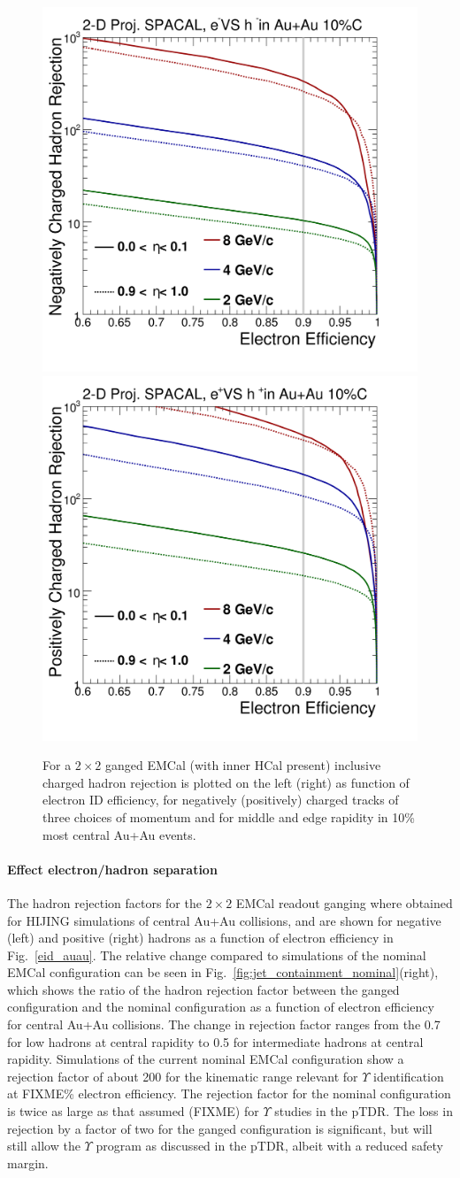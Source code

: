 \begin{figure}[hbt]
  \centering
  \includegraphics[width=0.4\linewidth]{figs/DrawEcal_Likelihood_Sum_RejectionCurve_AuAuSummary}
  \hspace{0.1\linewidth}
  \includegraphics[width=0.4\linewidth]{figs/DrawEcal_Likelihood_Sum_RejectionCurve_AuAuSummaryPos}
  \caption{For a $2\times2$ ganged EMCal (with inner HCal present)
    inclusive charged hadron rejection is plotted on the left (right)
    as function of electron ID efficiency, for negatively (positively)
    charged tracks of three choices of momentum and for middle and
    edge rapidity in 10\% most central Au+Au events.}
  \label{fig:eid_auau}
\end{figure}

\paragraph{Effect electron/hadron separation}

The hadron rejection factors  for the $2\times 2$ EMCal readout ganging where obtained for HIJING simulations of central Au+Au collisions, and are
shown for negative (left) and positive (right) hadrons as a function of electron efficiency in Fig.~\ref{eid_auau}. 
The relative change compared to simulations of the nominal EMCal configuration can be seen in Fig.~\ref{fig:jet_containment_nominal}(right), which shows
the ratio of the hadron rejection factor between the ganged configuration and the nominal configuration as a function
of electron efficiency for central Au+Au collisions. The change in rejection factor ranges from the 0.7 for low \pt hadrons
at central rapidity to 0.5 for intermediate \pt hadrons at central rapidity. Simulations of the current nominal EMCal 
configuration show a rejection factor of about 200 for the kinematic range relevant for $\Upsilon$ identification at FIXME\%
electron efficiency. The rejection factor for the nominal configuration is twice as large as that assumed (FIXME) 
for $\Upsilon$ studies in the pTDR. The loss in rejection by a factor of two for the ganged configuration is significant, but
will still allow the $\Upsilon$ program as discussed in the pTDR, albeit with a reduced safety margin.

